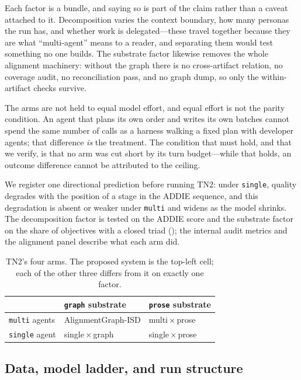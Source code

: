 Each factor is a bundle, and saying so is part of the claim rather than a caveat
attached to it. Decomposition varies the context boundary, how many personas the
run has, and whether work is delegated---these travel together because they are what
``multi-agent'' means to a reader, and separating them would test something no one
builds. The substrate factor likewise removes the whole alignment machinery: without
the graph there is no cross-artifact relation, no coverage audit, no reconciliation
pass, and no graph dump, so only the within-artifact checks survive.

The arms are not held to equal model effort, and equal effort is not the parity
condition. An agent that plans its own order and writes its own batches cannot spend
the same number of calls as a harness walking a fixed plan with developer agents;
that difference \emph{is} the treatment. The condition that must hold, and that we
verify, is that no arm was cut short by its turn budget---while that holds, an
outcome difference cannot be attributed to the ceiling.

We register one directional prediction before running TN2: under \texttt{single},
quality degrades with the position of a stage in the ADDIE sequence, and this
degradation is absent or weaker under \texttt{multi} and widens as the model
shrinks. The decomposition factor is tested on the ADDIE score and the substrate
factor on the share of objectives with a closed triad (); the
internal audit metrics and the alignment panel describe what each arm did.

\begin{table}[t]
  \caption{TN2's four arms. The proposed system is the top-left cell; each of the
  other three differs from it on exactly one factor.}
  \label{tab:ablation-arms}
  \small
  \begin{tabular}{@{}lll@{}}
    \toprule
    & \texttt{graph} substrate & \texttt{prose} substrate \\
    \midrule
    \texttt{multi} agents & AlignmentGraph-ISD & multi\,$\times$\,prose \\
    \texttt{single} agent & single\,$\times$\,graph & single\,$\times$\,prose \\
    \bottomrule
  \end{tabular}
\end{table}

\subsection{Data, model ladder, and run structure}
\label{sec:dataset}
\label{sec:setup}

